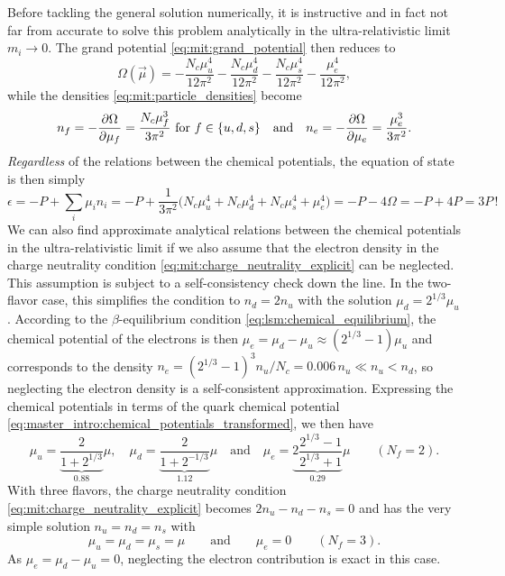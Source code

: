 Before tackling the general solution numerically,
it is instructive and in fact not far from accurate to solve this problem analytically in the ultra-relativistic limit $m_i \rightarrow 0$.
The grand potential \eqref{eq:mit:grand_potential} then reduces to
\begin{equation}
	\Omega(\vec{\mu}) = -\frac{N_c \mu_u^4}{12 \pi^2} - \frac{N_c \mu_d^4}{12 \pi^2} - \frac{N_c \mu_s^4}{12 \pi^2} - \frac{\mu_e^4}{12 \pi^2},
\label{eq:mit:grand_potential_massless}
\end{equation}
while the densities \eqref{eq:mit:particle_densities} become
\begin{equation}
	n_f = -\pdv{\Omega}{\mu_f} = \frac{N_c \mu_f^3}{3 \pi^2}
	\text{ for $f \in \{u,d,s\}$}
	\quad \text{and} \quad
	n_e = -\pdv{\Omega}{\mu_e} = \frac{    \mu_e^3}{3 \pi^2}.
\label{eq:mit:densities_massless}
\end{equation}
\emph{Regardless} of the relations between the chemical potentials,
the equation of state is then simply
\begin{equation}
	\epsilon = -P + \sum_i \mu_i n_i
	         = -P + \frac{1}{3 \pi^2} \Big(N_c \mu_u^4 + N_c \mu_d^4 + N_c \mu_s^4 + \mu_e^4\Big)
	         = -P - 4 \Omega 
	         = -P + 4 P 
	         = 3 P \, !
\label{eq:mit:eos_ur}
\end{equation}
We can also find approximate analytical relations between the chemical potentials in the ultra-relativistic limit
if we also assume that the electron density in the charge neutrality condition \eqref{eq:mit:charge_neutrality_explicit} can be neglected.
This assumption is subject to a self-consistency check down the line.
In the two-flavor case, this simplifies the condition to $n_d = 2 n_u$ with the solution $\mu_d = 2^{1/3} \mu_u$.
According to the $\beta$-equilibrium condition \eqref{eq:lsm:chemical_equilibrium},
the chemical potential of the electrons is then $\mu_e = \mu_d - \mu_u \approx (2^{1/3}-1) \mu_u$
and corresponds to the density $n_e = (2^{1/3}-1)^3 n_u / N_c = 0.006 \, n_u \ll n_u < n_d$,
so neglecting the electron density is a self-consistent approximation.
Expressing the chemical potentials in terms of the quark chemical potential \eqref{eq:master_intro:chemical_potentials_transformed},
we then have
\begin{equation}
	\mu_u = \underbrace{\frac{2}{1+2^{1/3}}}_{0.88} \mu , \quad
	\mu_d = \underbrace{\frac{2}{1+2^{-1/3}}}_{1.12} \mu \quad \text{and} \quad
	\mu_e = \underbrace{2 \frac{2^{1/3}-1}{2^{1/3}+1}}_{0.29} \mu
	\qquad (N_f = 2) .
\label{eq:mit:chemical_potentials_massless_2f}
\end{equation}
With three flavors, the charge neutrality condition \eqref{eq:mit:charge_neutrality_explicit} becomes $2 n_u - n_d - n_s = 0$
and has the very simple solution $n_u = n_d = n_s$ with
\begin{equation}
	\mu_u = \mu_d = \mu_s = \mu
	\qquad \text{and} \qquad
	\mu_e = 0
	\qquad (N_f = 3) .
\label{eq:mit:chemical_potentials_massless_3f}
\end{equation}
As $\mu_e = \mu_d - \mu_u = 0$, neglecting the electron contribution is exact in this case.

